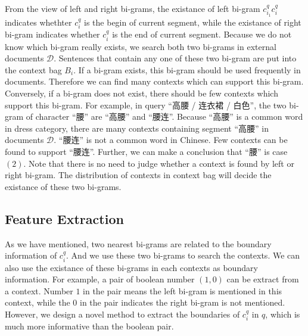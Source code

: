 From the view of left and right bi-grams, the existance of left bi-gram $c_{i_1}^q c_i^q$ indicates whethter $c_i^q$ is the begin of current segment, while the existance of right bi-gram indicates whether $c_i^q$ is the end of current segment. Because we do not know which bi-gram really exists, we search both two bi-grams in external documents $\mathcal{D}$. Sentences that contain any one of these two bi-gram are put into the context bag $B_i$. If a bi-gram exists, this bi-gram should be used frequently in documents. Therefore we can find many contexts which can support this bi-gram. Conversely, if a bi-gram does not exist, there should be few contexts which support this bi-gram. For example, in query ``高腰 / 连衣裙 / 白色'', the two bi-gram of character ``腰'' are ``高腰'' and ``腰连''. Because ``高腰'' is a common word in dress category, there are many contexts containing segment ``高腰'' in documents $\mathcal{D}$. ``腰连'' is not a common word in Chinese. Few contexts can be found to support ``腰连''. Further, we can make a conclusion that ``腰'' is case $(2)$. Note that there is no need to judge whether a context is found by left or right bi-gram. The distribution of contexts in context bag will decide the existance of these two bi-grams.




\subsection{Feature Extraction}

As we have mentioned, two nearest bi-grams are related to the boundary information of $c_i^q$. And we use these two bi-grams to search the contexts. We can also use the existance of these bi-grams in each contexts as boundary information. For example, a pair of boolean number $(1, 0)$ can be extract from a context. Number $1$ in the pair means the left bi-gram is mentioned in this context, while the $0$ in the pair indicates the right bi-gram is not mentioned. However, we design a novel method to extract the boundaries of $c_i^q$ in $q$, which is much more informative than the boolean pair.

